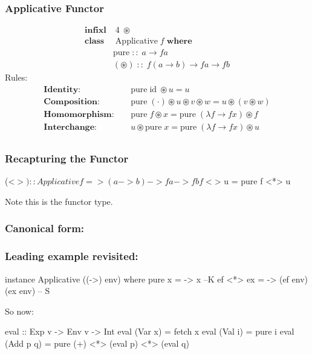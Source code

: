 \documentclass[18pt]{beamer}
\begin{document}
\begin{frame}[fragile] \frametitle{Applicative Functor}

\begin{align*}
  \mathbf{infixl} & \; 4 \; \circledast\\
  \mathbf{class} & \; \mathrm{Applicative} \; f \; \mathbf{where}\\
  \quad & \mathrm{pure} \; :: \; a \rightarrow f a\\
  \quad & (\circledast) \; :: \; f (a \rightarrow b) \rightarrow f a
\rightarrow f b
\end{align*}
Rules:
\begin{align*}
  \mathbf{Identity:} \quad & \mathrm{pure} \; \mathrm{id} \;
  \circledast u = u\\
  \mathbf{Composition:} \quad & \mathrm{pure} \; (\cdot) \circledast u
  \circledast v \circledast w = u \circledast (v \circledast w)\\
  \mathbf{Homomorphism:} \quad & \mathrm{pure} \; f \circledast x =
  \mathrm{pure} \; (\lambda f \rightarrow f x) \circledast f\\
  \mathbf{Interchange:} \quad & u \circledast \mathrm{pure} \; x = \mathrm{pure} \;
  (\lambda f \rightarrow f x) \circledast u\\
\end{align*}
\end{frame}

\begin{frame}[fragile] \frametitle{Recapturing the Functor}
  \begin{code}
    (<$>) :: Applicative f =>
          (a -> b) -> f a -> f b
    f <$> u = pure f <*> u
  \end{code}
  Note this is the functor type.
\end{frame}
\begin{frame}[fragile]\frametitle{Canonical form:}
\end{frame}

\begin{frame}[fragile] \frametitle{Leading example revisited:}
\begin{code}
instance Applicative ((->) env) where
  pure x = \env -> x --K
  ef <*> ex = \env -> (ef env)(ex env) -- S
\end{code}
So now:\\
\begin{code}
eval :: Exp v -> Env v -> Int
eval (Var x) = fetch x
eval (Val i) = pure i
eval (Add p q) =
  pure (+) <*>  (eval p) <*> (eval q)
\end{code}
\end{frame}
\end{document}
